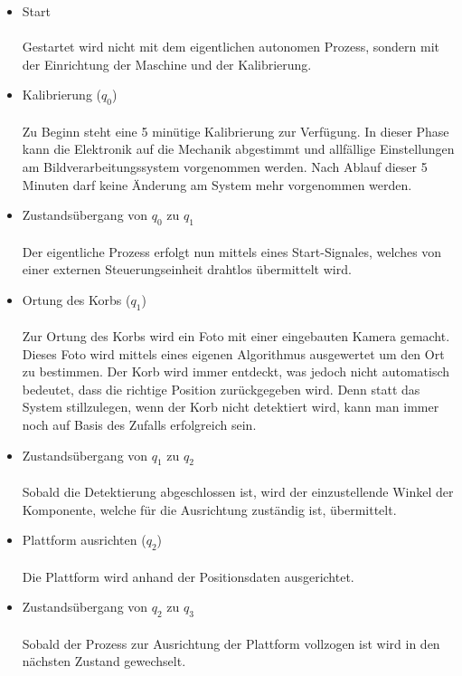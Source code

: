 \begin{itemize}
	
	\item Start \\ \\
		Gestartet wird nicht mit dem eigentlichen autonomen Prozess, sondern mit der Einrichtung der Maschine und der Kalibrierung.
	
	\item Kalibrierung ($q_{0}$) \\ \\
	    Zu Beginn steht eine 5 minütige Kalibrierung zur Verfügung. In dieser Phase kann die Elektronik auf die Mechanik abgestimmt und allfällige Einstellungen am Bildverarbeitungssystem vorgenommen werden. Nach Ablauf dieser 5 Minuten darf keine Änderung am System mehr
		vorgenommen werden.
		
	\item Zustandsübergang von $q_{0}$ zu $q_{1}$ \\ \\
		  Der eigentliche Prozess erfolgt nun mittels eines Start-Signales, welches von einer externen Steuerungseinheit drahtlos übermittelt wird.
		
	\item Ortung des Korbs ($q_{1}$) \\ \\
		  Zur Ortung des Korbs wird ein Foto mit einer eingebauten Kamera gemacht. Dieses Foto wird mittels eines eigenen Algorithmus ausgewertet um den Ort zu bestimmen. Der Korb wird immer entdeckt, was jedoch nicht automatisch bedeutet, dass die richtige Position zurückgegeben wird. Denn statt das System stillzulegen, wenn der Korb nicht detektiert wird, kann man immer noch auf Basis des Zufalls erfolgreich sein.
		  
	\item Zustandsübergang von $q_{1}$ zu $q_{2}$ \\ \\
		  Sobald die Detektierung abgeschlossen ist, wird der einzustellende Winkel der Komponente, welche für die Ausrichtung zuständig ist, übermittelt.
		  
	\item Plattform ausrichten ($q_{2}$) \\ \\
		  Die Plattform wird anhand der Positionsdaten ausgerichtet.
		  
	\item Zustandsübergang von $q_{2}$ zu $q_{3}$ \\ \\
		  Sobald der Prozess zur Ausrichtung der Plattform vollzogen ist wird in den nächsten Zustand gewechselt.
		  

\end{itemize}
